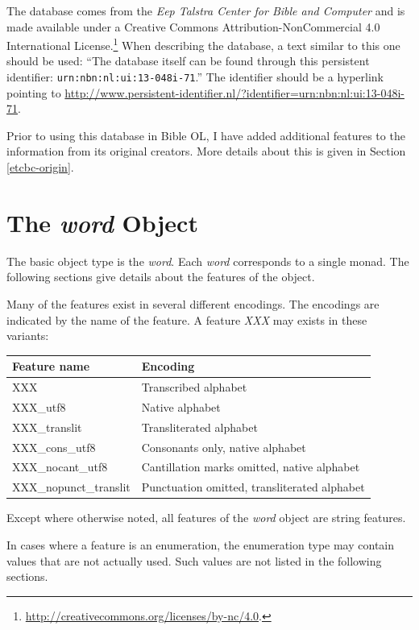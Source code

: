 \documentclass[11pt,oneside,a4paper]{memoir}
\begin{document}
The database comes from the \emph{Eep Talstra Center for Bible and Computer} and is made available
under a Creative Commons Attribution-NonCommercial 4.0 International
License.\footnote{\url{http://creativecommons.org/licenses/by-nc/4.0}.} When describing the
database, a text similar to this one should be used: ``The database itself can be found through this
persistent identifier: \texttt{urn:nbn:nl:ui:13-048i-71}.'' The identifier should be a hyperlink
pointing to \url{http://www.persistent-identifier.nl/?identifier=urn:nbn:nl:ui:13-048i-71}.

Prior to using this database in Bible OL, I have added additional features to the information from
its original creators. More details about this is given in Section
\ref{etcbc-origin}.

\section{The \emph{word} Object}

The basic object type is the \emph{word}. Each \emph{word} corresponds to a single monad. The following
sections give details about the features of the object.

Many of the features exist in several different encodings. The encodings are indicated by the name
of the feature. A feature \emph{XXX} may exists in these variants:

\begin{center}
  \begin{tabular}{ll}
    \textbf{Feature name} & \textbf{Encoding}\\
    \hline
    XXX & Transcribed alphabet\\
    XXX\_utf8 & Native alphabet\\
    XXX\_translit & Transliterated alphabet\\
    XXX\_cons\_utf8 & Consonants only, native alphabet\\
    XXX\_nocant\_utf8 & Cantillation marks omitted, native alphabet\\
    XXX\_nopunct\_translit & Punctuation omitted, transliterated alphabet\\
  \end{tabular}
\end{center}

Except where otherwise noted, all features of the \emph{word} object are string features.

In cases where a feature is an enumeration, the enumeration type may contain values that are not
actually used. Such values are not listed in the following sections.
\end{document}
